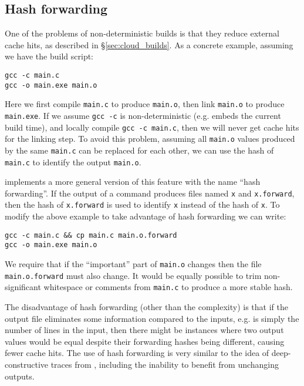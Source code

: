 \subsection{Hash forwarding}
\label{sec:forward_hashes}

One of the problems of non-deterministic builds is that they reduce external cache hits, as described in \S\ref{sec:cloud_builds}. As a concrete example, assuming we have the build script:

\begin{verbatim}
gcc -c main.c
gcc -o main.exe main.o
\end{verbatim}

Here we first compile \texttt{main.c} to produce \texttt{main.o}, then link \texttt{main.o} to produce \texttt{main.exe}. If we assume \texttt{gcc -c} is non-deterministic (e.g. embeds the current build time), and locally compile \texttt{gcc -c main.c}, then we will never get cache hits for the linking step. To avoid this problem, assuming all \texttt{main.o} values produced by the same \texttt{main.c} can be replaced for each other, we can use the hash of \texttt{main.c} to identify the output \texttt{main.o}.

\Rattle implements a more general version of this feature with the name ``hash forwarding''. If the output of a command produces files named \texttt{x} and \texttt{x.forward}, then the hash of \texttt{x.forward} is used to identify \texttt{x} instead of the hash of \texttt{x}. To modify the above example to take advantage of hash forwarding we can write:

\begin{verbatim}
gcc -c main.c && cp main.c main.o.forward
gcc -o main.exe main.o
\end{verbatim}

We require that if the ``important'' part of \texttt{main.o} changes then the file \texttt{main.o.forward} must also change. It would be equally possible to trim non-significant whitespace or comments from \texttt{main.c} to produce a more stable hash.

The disadvantage of hash forwarding (other than the complexity) is that if the output file eliminates some information compared to the inputs, e.g. is simply the number of lines in the input, then there might be instances where two output values would be equal despite their forwarding hashes being different, causing fewer cache hits. The use of hash forwarding is very similar to the idea of deep-constructive traces from \citet[\S4.2.4]{build_systems_a_la_carte}, including the inability to benefit from unchanging outputs.



